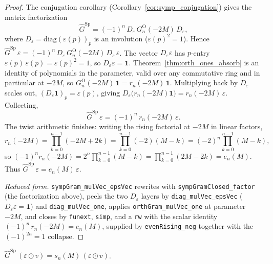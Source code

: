 \begin{proof}
\leanok
{}
The conjugation corollary (Corollary~\ref{cor:symp_conjugation}) gives the
matrix factorization
\[
  \widehat G^{\mathrm{Sp}} = (-1)^n\,D_\varepsilon\,G^{\mathrm O}_n(-2M)\,D_\varepsilon ,
\]
where $D_\varepsilon=\mathrm{diag}(\varepsilon(p))_p$ is an involution
($\varepsilon(p)^2=1$). Hence
$\widehat G^{\mathrm{Sp}}\,\varepsilon
  =(-1)^n\,D_\varepsilon\,G^{\mathrm O}_n(-2M)\,D_\varepsilon\,\varepsilon$.
The vector $D_\varepsilon\varepsilon$ has $p$-entry
$\varepsilon(p)\,\varepsilon(p)=\varepsilon(p)^2=1$, so $D_\varepsilon\varepsilon=\mathbf 1$.
Theorem~\ref{thm:orth_ones_absorb} is an identity of polynomials in the
parameter, valid over any commutative ring and in particular at $-2M$, so
$G^{\mathrm O}_n(-2M)\,\mathbf 1 = r_n(-2M)\,\mathbf 1$. Multiplying back by
$D_\varepsilon$ scales out, $(D_\varepsilon\mathbf 1)_p=\varepsilon(p)$, giving
$D_\varepsilon\bigl(r_n(-2M)\mathbf 1\bigr)=r_n(-2M)\,\varepsilon$. Collecting,
\[
  \widehat G^{\mathrm{Sp}}\,\varepsilon=(-1)^n\,r_n(-2M)\,\varepsilon .
\]
The twist arithmetic finishes: writing the rising factorial at $-2M$ in
linear factors,
\[
  r_n(-2M)=\prod_{k=0}^{n-1}(-2M+2k)=\prod_{k=0}^{n-1}(-2)(M-k)=(-2)^n\prod_{k=0}^{n-1}(M-k),
\]
so $(-1)^n r_n(-2M)=2^n\prod_{k=0}^{n-1}(M-k)=\prod_{k=0}^{n-1}(2M-2k)=e_n(M)$.
Thus $\widehat G^{\mathrm{Sp}}\,\varepsilon=e_n(M)\,\varepsilon$.

\medskip
\noindent\emph{Reduced form.} \texttt{sympGram\_mulVec\_epsVec} rewrites with
\texttt{sympGramClosed\_factor} (the factorization above), peels the two
$D_\varepsilon$ layers by \texttt{diag\_mulVec\_epsVec} ($D_\varepsilon\varepsilon=\mathbf 1$)
and \texttt{diag\_mulVec\_one}, applies \texttt{orthGram\_mulVec\_one} at parameter
$-2M$, and closes by \texttt{funext}, \texttt{simp}, and a \texttt{rw} with the scalar identity
$(-1)^n\,r_n(-2M)=e_n(M)$, supplied by \texttt{evenRising\_neg} together with
the $(-1)^{2n}=1$ collapse.
\end{proof}

\begin{theorem}\label{thm:symp_eps_det_absorb}
\leanok
{}
$\widehat G^{\mathrm{Sp}}\,(\varepsilon\odot v) = s_n(M)\,
(\varepsilon\odot v)$.
\end{theorem}

